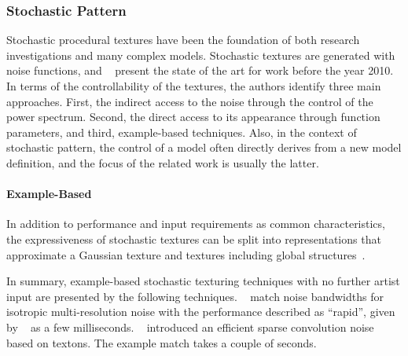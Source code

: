 \subsubsection{Stochastic Pattern}
\label{subsubsec:analysis_distribution_and_repetition_stochastic}

Stochastic procedural textures have been the foundation of both research investigations and many complex models. Stochastic textures are generated with noise functions, and \citeauthor*{lagae_2010_sap}~\cite{lagae_2010_sap} present the state of the art for work before the year 2010. In terms of the controllability of the textures, the authors identify three main approaches. First, the indirect access to the noise through the control of the power spectrum. Second, the direct access to its appearance through function parameters, and 
third, example-based techniques. Also, in the context of stochastic pattern, the control of a model often directly derives from a new model definition, and the focus of the related work is usually the latter.


\paragraph*{Example-Based}
\label{para:analysis_stochastic_examplebased_control}



In addition to performance and input requirements as common characteristics, the expressiveness of stochastic textures can be split into representations that approximate a Gaussian texture and textures including global structures~\cite{galerne_2017_tno,lagae_2010_sap}.

In summary, example-based stochastic texturing techniques with no further artist input are presented by the following techniques. \citeauthor*{lagae_2010_pis}~\cite{lagae_2010_pis} match noise bandwidths for isotropic multi-resolution noise with the performance described as ``rapid'', given by \citeauthor*{gilet_2012_mkn}~\cite{gilet_2012_mkn} as a few milliseconds. \citeauthor*{galerne_2017_tno}~\cite{galerne_2017_tno} introduced an efficient sparse convolution noise based on textons. The example match takes a couple of seconds.

